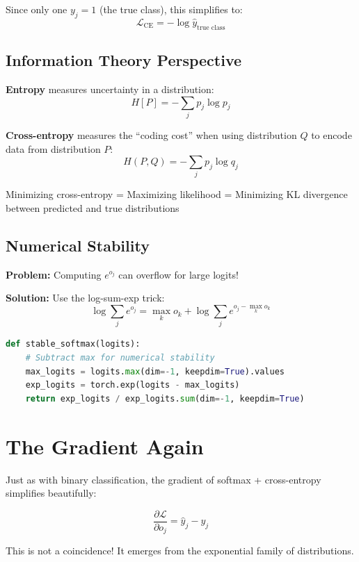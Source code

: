 \documentclass{article}
\begin{document}
Since only one $y_j = 1$ (the true class), this simplifies to:
$$\mathcal{L}_{\text{CE}} = -\log \hat{y}_{\text{true class}}$$

\subsection{Information Theory Perspective}

\textbf{Entropy} measures uncertainty in a distribution:
$$H[P] = -\sum_j p_j \log p_j$$

\textbf{Cross-entropy} measures the ``coding cost'' when using distribution $Q$ to encode data from distribution $P$:
$$H(P, Q) = -\sum_j p_j \log q_j$$

\begin{tcolorbox}[colback=green!5!white, colframe=green!50!black, title=Connection to Machine Learning]
Minimizing cross-entropy = Maximizing likelihood = Minimizing KL divergence between predicted and true distributions
\end{tcolorbox}

\subsection{Numerical Stability}

\textbf{Problem:} Computing $e^{o_j}$ can overflow for large logits!

\textbf{Solution:} Use the log-sum-exp trick:
$$\log \sum_j e^{o_j} = \max_k o_k + \log \sum_j e^{o_j - \max_k o_k}$$

\begin{lstlisting}[language=Python, caption=Stable softmax implementation]
def stable_softmax(logits):
    # Subtract max for numerical stability
    max_logits = logits.max(dim=-1, keepdim=True).values
    exp_logits = torch.exp(logits - max_logits)
    return exp_logits / exp_logits.sum(dim=-1, keepdim=True)
\end{lstlisting}

\section{The Gradient Again}

Just as with binary classification, the gradient of softmax + cross-entropy simplifies beautifully:

$$\frac{\partial \mathcal{L}}{\partial o_j} = \hat{y}_j - y_j$$

This is not a coincidence! It emerges from the exponential family of distributions.
\end{document}
